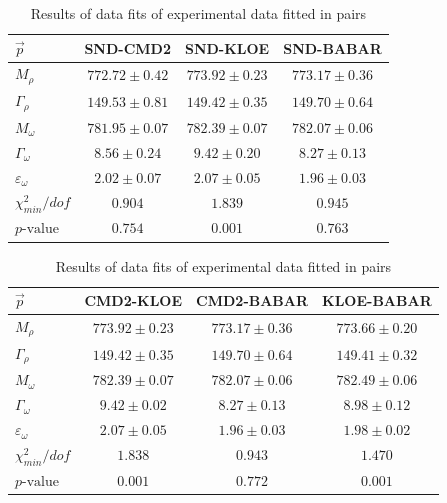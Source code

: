 \documentclass[a4paper]{article}
\begin{document}
\begin{table}[h!]
    \caption{Results of data fits of experimental data fitted in pairs}
    \centering
    \begin{tabular}{|l|c|c|c|}
        \hline
        $\vec{p}$ & SND-CMD2 & SND-KLOE & SND-BABAR  \\ \hline
        $M_{\rho}$              & $772.72	\pm 0.42$ & $773.92	\pm 0.23$ &$773.17	\pm 0.36 $ \\
        $\Gamma_{\rho}$         & $149.53	\pm 0.81$ & $149.42	\pm 0.35$ &$149.70	\pm 0.64 $\\
        $M_{\omega}$            & $781.95	\pm 0.07$ & $782.39	\pm 0.07$ &$782.07	\pm 0.06 $\\
        $\Gamma_{\omega}$       & $8.56	\pm 0.24    $ & $9.42	\pm 0.20$ &$8.27	\pm 0.13 $\\
        $\varepsilon_{\omega}$  & $2.02	\pm 0.07    $ & $2.07	\pm 0.05$ &$1.96	\pm 0.03 $\\
        \hline
        $\chi^2_{min}/dof$      & $0.904$&$ 1.839$&$ 0.945$\\
        $p\text{-value}$        & $0.754$&$ 0.001$&$ 0.763$\\
        \hline

    \end{tabular}
\end{table}

\begin{table}[h!]
    \caption{Results of data fits of experimental data fitted in pairs}
    \centering
    \begin{tabular}{|l|c|c|c|}
        \hline
        $\vec{p}$ & CMD2-KLOE & CMD2-BABAR & KLOE-BABAR  \\ \hline
        $M_{\rho}$              & $773.92	\pm 0.23$ & $773.17	\pm 0.36$ &$773.66	\pm 0.20 $ \\
        $\Gamma_{\rho}$         & $149.42	\pm 0.35$ & $149.70	\pm 0.64$ &$149.41	\pm 0.32 $\\
        $M_{\omega}$            & $782.39	\pm 0.07$ & $782.07	\pm 0.06$ &$782.49	\pm 0.06 $\\
        $\Gamma_{\omega}$       & $9.42	\pm 0.02    $ & $8.27	\pm 0.13$ &$8.98	\pm 0.12 $\\
        $\varepsilon_{\omega}$  & $2.07	\pm 0.05    $ & $1.96	\pm 0.03$ &$1.98	\pm 0.02 $\\
        \hline
        $\chi^2_{min}/dof$      & $1.838$&$ 0.943$&$ 1.470$\\
        $p\text{-value}$        & $0.001$&$ 0.772$&$ 0.001$\\
        \hline

    \end{tabular}
\end{table}
\end{document}
